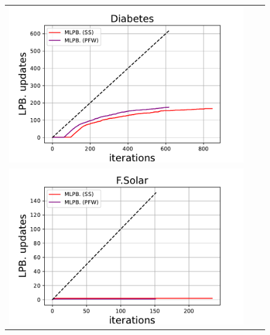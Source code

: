 \begin{figure}[p]
\begin{tabular}{ccc}
\begin{minipage}[t]{0.31\hsize}
            \includegraphics[keepaspectratio, scale=0.30]
            {figure/mlpb_lpb_update_diabetis.pdf}
        \end{minipage}
        \\
        \begin{minipage}[t]{0.31\hsize}
            \centering
            \includegraphics[keepaspectratio, scale=0.30]
            {figure/mlpb_lpb_update_flare_solar.pdf}
        \end{minipage}
        &
        \begin{minipage}[t]{0.31\hsize}
            \centering
            \includegraphics[keepaspectratio, scale=0.30]

\end{minipage}
\end{tabular}
\end{figure}
